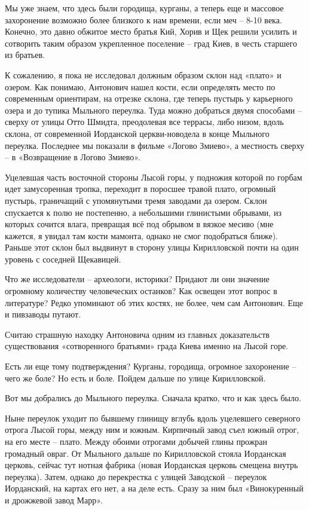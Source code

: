 Мы уже знаем, что здесь были городища, курганы, а теперь еще и массовое захоронение возможно более близкого к нам времени, если меч – 8-10 века. Конечно, это давно обжитое место братья Кий, Хорив и Щек решили усилить и сотворить таким образом укрепленное поселение – град Киев, в честь старшего из братьев.

К сожалению, я пока не исследовал должным образом склон над «плато» и озером. Как понимаю, Антонович нашел кости, если определять место по современным ориентирам, на отрезке склона, где теперь пустырь у карьерного озера и до тупика Мыльного переулка. Туда можно добраться двумя способами – сверху от улицы Отто Шмидта, преодолевая все террасы, либо низом, вдоль склона, от современной Иорданской церкви-новодела в конце Мыльного переулка. Последнее мы показали в фильме «Логово Змиево», а местность сверху – в «Возвращение в Логово Змиево».

Уцелевшая часть восточной стороны Лысой горы, у подножия которой по горбам идет замусоренная тропка, переходит в поросшее травой плато, огромный пустырь, граничащий с упомянутыми тремя заводами да озером. Склон спускается к полю не постепенно, а небольшими глинистыми обрывами, из которых сочится влага, превращая всё под обрывом в вязкое месиво (мне кажется, я увидал там кости мамонта, однако не смог подобраться ближе). Раньше этот склон был выдвинут в сторону улицы Кирилловской почти на один уровень с соседней Щекавицей.

Что же исследователи – археологи, историки? Придают ли они значение огромному количеству человеческих останков? Как освещен этот вопрос в литературе? Редко упоминают об этих костях, не более, чем сам Антонович. Еще и пивзаводы путают. 

Считаю страшную находку Антоновича одним из главных доказательств существования «сотворенного братьями» града Киева именно на Лысой горе.

Есть ли еще тому подтверждения? Курганы, городища, огромное захоронение – чего же боле? Но есть и боле. Пойдем дальше по улице Кирилловской.

Вот мы добрались до Мыльного переулка. Сначала кратко, что и как здесь было.

Ныне переулок уходит по бывшему глинищу вглубь вдоль уцелевшего северного отрога Лысой горы, между ним и южным. Кирпичный завод съел южный отрог, на его месте – плато. Между обоими отрогами добычей глины прожран громадный овраг. От Мыльного дальше по Кирилловской стояла Иорданская церковь, сейчас тут нотная фабрика (новая Иорданская церковь смещена внутрь переулка). Затем, однако до перекрестка с улицей Заводской – переулок Иорданский, на картах его нет, а на деле есть. Сразу за ним был «Винокуренный и дрожжевой завод Марр».

